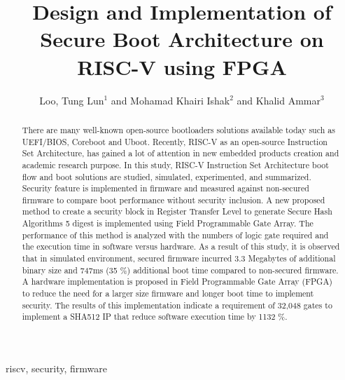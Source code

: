 \documentclass[review]{elsarticle}
\begin{document}
\begin{frontmatter}

\title{Design and Implementation of Secure Boot Architecture on RISC-V using FPGA}

\author{%
Loo, Tung Lun$^{1}$ and Mohamad Khairi Ishak$^{2}$ and Khalid Ammar$^{3}$}
\address{$^{1}$School of Electrical and Electronic Engineering, Universiti Sains Malaysia, 14300, Nibong Tebal, Pulau Pinang, Malaysia.\\
$^{2}$School of Electrical and Electronic Engineering, Universiti Sains Malaysia, 14300, Nibong Tebal, Pulau Pinang, Malaysia.\\
$^{3}$Ajman University, UAE. k.ammar@ajman.ac.ae\\
}

\begin{abstract}
There are many well-known open-source bootloaders solutions available today such as UEFI/BIOS, Coreboot and Uboot.
Recently, RISC-V as an open-source Instruction Set Architecture, has gained a lot of attention in new embedded products
creation and academic research purpose. In this study, RISC-V Instruction Set Architecture boot flow and
boot solutions are studied, simulated, experimented, and summarized. Security feature is implemented in firmware and
measured against non-secured firmware to compare boot performance without security inclusion. A new proposed method
to create a security block in Register Transfer Level to generate Secure Hash Algorithms 5 digest is implemented using Field
Programmable Gate Array. The performance of this method is analyzed with the numbers of logic gate required and the
execution time in software versus hardware. As a result of this study, it is observed that in simulated environment, secured
firmware incurred 3.3 Megabytes of additional binary size and 747ms (35 \%) additional boot time compared to non-secured
firmware. A hardware implementation is proposed in Field Programmable Gate Array (FPGA) to reduce the need for a larger
size firmware and longer boot time to implement security. The results of this implementation indicate a requirement of
32,048 gates to implement a SHA512 IP that reduce software execution time by 1132 \%.
\end{abstract}

\begin{keyword}
riscv, security, firmware
\end{keyword}

\end{frontmatter}
\end{document}
